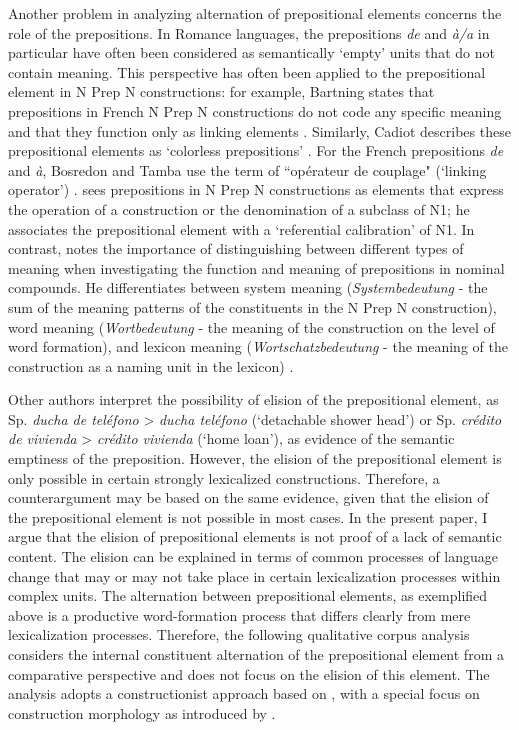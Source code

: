 \documentclass[output=paper]{langsci/langscibook}
\begin{document}
Another problem in analyzing alternation of prepositional elements concerns the role of the prepositions. In Romance languages, the prepositions \textit{de} and \textit{à/a} in particular have often been considered as semantically `empty' units that do not contain meaning. This perspective has often been applied to the prepositional element in N Prep N constructions: for example, Bartning states that prepositions in French N Prep N constructions do not code any specific meaning and that they function only as linking elements \citep[164]{Bartning:1993}. Similarly, Cadiot describes these prepositional elements as `colorless prepositions' \citep[164]{Bartning:1993}. For the French prepositions \textit{de} and \textit{à}, Bosredon and Tamba use the term of ``opérateur de couplage" (`linking operator') \citep[44]{Bosredon:1991}. \citet{Cadiot:1997} sees prepositions in N Prep N constructions as elements that express the operation of a construction or the denomination of a subclass of N1; he associates the prepositional element with a `referential calibration' of N1. In contrast, \citet{Laumann:1998} notes the importance of distinguishing between different types of meaning when investigating the function and meaning of prepositions in nominal compounds. He differentiates between system meaning (\textit{Systembedeutung} - the sum of the meaning patterns of the constituents in the N Prep N construction), word meaning (\textit{Wortbedeutung} - the meaning of the construction on the level of word formation), and lexicon meaning (\textit{Wortschatzbedeutung} - the meaning of the construction as a naming unit in the lexicon) \citep[32]{Laumann:1998}.

Other authors interpret the possibility of elision of the prepositional element, as Sp. \textit{ducha de teléfono}  > \textit{ducha teléfono} (`detachable shower head') or Sp.  \textit{crédito de vivienda} > \textit{crédito  vivienda} (`home loan'), as evidence of the semantic emptiness of the preposition. However, the elision of the prepositional element is only possible in certain strongly lexicalized constructions. Therefore, a counterargument may be based on the same evidence, given that the elision of the prepositional element is not possible in most cases. In the present paper, I argue that the elision of prepositional elements is not proof of a lack of semantic content. The elision can be explained in terms of common processes of language change that may or may not take place in certain lexicalization processes within complex units. The alternation between prepositional elements, as exemplified above is a productive word-formation process that differs clearly from mere lexicalization processes. Therefore, the following qualitative corpus analysis considers the internal constituent alternation of the prepositional element from a comparative perspective and does not focus on the elision of this element. The analysis adopts a constructionist approach based on \citet{Goldberg:1995,Goldberg:2006}, with a special focus on construction morphology as introduced by \citet{Booij:2010,Booij:2015}.
\end{document}
